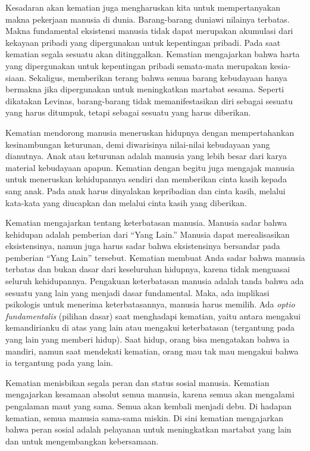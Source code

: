 \documentclass[11pt,twoside,a5paper,openany]{memoir}
\begin{document}
Kesadaran akan kematian juga mengharuskan kita untuk mempertanyakan
makna pekerjaan manusia di dunia. Barang-barang duniawi nilainya
terbatas. Makna fundamental eksistensi manusia tidak dapat merupakan
akumulasi dari kekayaan pribadi yang dipergunakan untuk kepentingan
pribadi. Pada saat kematian segala sesuatu akan ditinggalkan. Kematian
mengajarkan bahwa harta yang dipergunakan untuk kepentingan pribadi
semata-mata merupakan kesia-siaan. Sekaligus, memberikan terang bahwa
semua barang kebudayaan hanya bermakna jika dipergunakan untuk
meningkatkan martabat sesama. Seperti dikatakan Levinas, barang-barang
tidak memanifestasikan diri sebagai sesuatu yang harus ditumpuk, tetapi
sebagai sesuatu yang harus diberikan.

Kematian mendorong manusia meneruskan hidupnya dengan mempertahankan
kesinambungan keturunan, demi diwarisinya nilai-nilai kebudayaan yang
dianutnya. Anak atau keturunan adalah manusia yang lebih besar dari
karya material kebudayaan apapun. Kematian dengan begitu juga mengajak
manusia untuk meneruskan kehidupannya sendiri dan memberikan cinta kasih
kepada sang anak. Pada anak harus dinyalakan kepribadian dan cinta
kasih, melalui kata-kata yang diucapkan dan melalui cinta kasih yang
diberikan.

Kematian mengajarkan tentang keterbatasan manusia. Manusia sadar bahwa
kehidupan adalah pemberian dari ``Yang Lain.'' Manusia dapat
merealisasikan eksistensinya, namun juga harus sadar bahwa eksistensinya
bersandar pada pemberian ``Yang Lain'' tersebut. Kematian membuat Anda
sadar bahwa manusia terbatas dan bukan dasar dari keseluruhan hidupnya,
karena tidak menguasai seluruh kehidupannya. Pengakuan keterbatasan
manusia adalah tanda bahwa ada sesuatu yang lain yang menjadi dasar
fundamental. Maka, ada implikasi psikologis untuk menerima
keterbatasannya, manusia harus memilih. Ada \emph{optio fundamentalis}
(pilihan dasar) saat menghadapi kematian, yaitu antara mengakui
kemandirianku di atas yang lain atau mengakui keterbatasan (tergantung
pada yang lain yang memberi hidup). Saat hidup, orang bisa mengatakan
bahwa ia mandiri, namun saat mendekati kematian, orang mau tak mau
mengakui bahwa ia tergantung pada yang lain.

Kematian menisbikan segala peran dan status sosial manusia. Kematian
mengajarkan kesamaan absolut semua manusia, karena semua akan mengalami
pengalaman maut yang sama. Semua akan kembali menjadi debu. Di hadapan
kematian, semua manusia sama-sama miskin. Di sini kematian mengajarkan
bahwa peran sosial adalah pelayanan untuk meningkatkan martabat yang
lain dan untuk mengembangkan kebersamaan.
\end{document}
